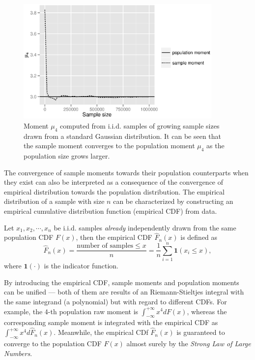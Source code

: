 \begin{figure}[htbp]
\begin{center}
\includegraphics[width=0.9\textwidth]{figures/ch2_u4converge_gauss.eps}
\caption{Moment $ \mu_4 $ computed from i.i.d. samples of growing sample sizes drawn from a standard Gaussian distribution. It can be seen that the sample  moment converges to the population moment $ \mu_4 $ as the population size grows larger.  }
\label{fig:ch2_u4converge}
\end{center}
\end{figure}

The convergence of sample moments towards their population counterparts when they exist can also be interpreted as a consequence of the convergence of empirical distribution towards the population distribution. The empirical distribution of a sample with size $ n $ can be characterized by constructing an empirical cumulative distribution function (empirical CDF) from data.
\begin{defn}
Let $ x_1, x_2, \cdots, x_n $ be i.i.d. samples \textit{already} independently drawn from the same population CDF $ F(x) $, then the empirical CDF $ \hat{F}_n(x) $  is defined as 
\begin{equation}
\hat{F}_n(x) = \frac{\text{number of samples} \leq x}{n} = \frac{1}{n} \sum_{i=1}^n \bm{1}(x_i \leq x),
\end{equation}
where $ \bm{1}(\cdot) $ is the indicator function. 
\end{defn}

By introducing the empirical CDF, sample moments and population moments can be unified --- both of them are results of an Riemann-Stieltjes integral with the same integrand (a polynomial) but with regard to different CDFs. For example, the 4-th population raw moment is $ \int_{-\infty}^{+\infty} x^4 dF(x) $, whereas the corresponding sample moment is integrated with the empirical CDF as $ \int_{-\infty}^{+\infty} x^4 d\hat{F}_n(x) $. Meanwhile, the empirical CDf $ \hat{F}_n(x) $ is guaranteed to converge to the population CDF $ F(x) $ almost surely by the \textit{Strong Law of Large Numbers}.

